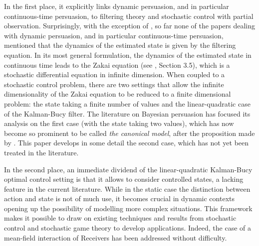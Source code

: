 \documentclass[a4paper,10pt]{article}
\theoremstyle{definition}
\theoremstyle{plain}
\numberwithin{equation}{section}
\begin{document}
In the first place, it explicitly links dynamic persuasion, and in particular continuous-time persuasion, to filtering theory and stochastic control with partial observation. 
Surprisingly, with the exception of \cite{Escude23}, so far none of the papers dealing with dynamic persuasion, and in particular continuous-time persuasion, mentioned that the dynamics of the estimated state is given by the filtering equation. In its most general formulation, the dynamics of the estimated state in continuous time leads to the Zakai equation (see \cite{Bain09}, Section 3.5), which is a stochastic differential equation in infinite dimension. When coupled to a stochastic control problem, there are two settings that allow the infinite dimensionality of the Zakai equation to be reduced to a finite dimensional problem: the  state taking a finite number of values and the linear-quadratic case of the Kalman-Bucy filter. The literature on Bayesian persuasion has focused its analysis on the first case (with the state taking two values), which has now become so prominent to be called {\em the canonical model}, after the proposition made by \cite{Che23}. This paper develops in some detail the second case, which has not yet been treated in the literature. 

In the second place, an immediate dividend of the linear-quadratic Kalman-Bucy optimal control setting is that it allows to consider controlled states, a lacking feature in the current literature. While in the static case the distinction between action and state is not of much use, it becomes crucial in dynamic contexts opening up the possibility of modelling more complex situations. This framework makes it possible to draw on existing techniques and results from stochastic control and stochastic game theory to develop applications. Indeed, the case of a mean-field interaction of Receivers has been addressed without difficulty. 
\end{document}

